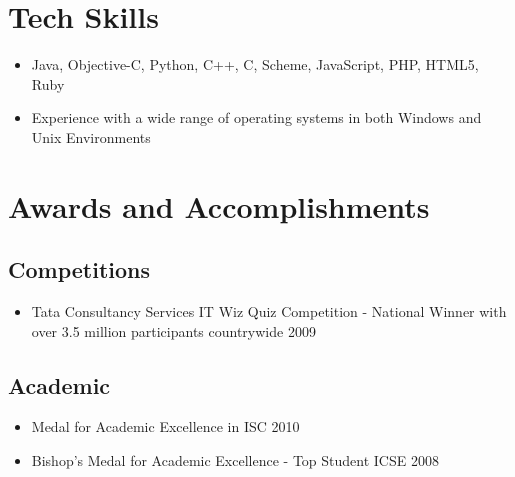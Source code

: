 \documentclass[11pt,a4paper]{moderncv}
\begin{document}
\section{Tech Skills}
\begin{itemize}
\item Java, Objective-C, Python, C++, C, Scheme, JavaScript, PHP, HTML5, Ruby
\item Experience with a wide range of operating systems in both Windows and Unix Environments
\end{itemize}
\section{Awards and Accomplishments}
\subsection{Competitions}
\begin{itemize}
\item Tata Consultancy Services IT Wiz Quiz Competition - National Winner with over 3.5
million participants countrywide \hfill 2009
\end{itemize}
\subsection{Academic}
\begin{itemize}
\item Medal for Academic Excellence in ISC \hfill 2010
\item Bishop's Medal for Academic Excellence - Top Student ICSE \hfill 2008
\end{itemize}
\end{document}
